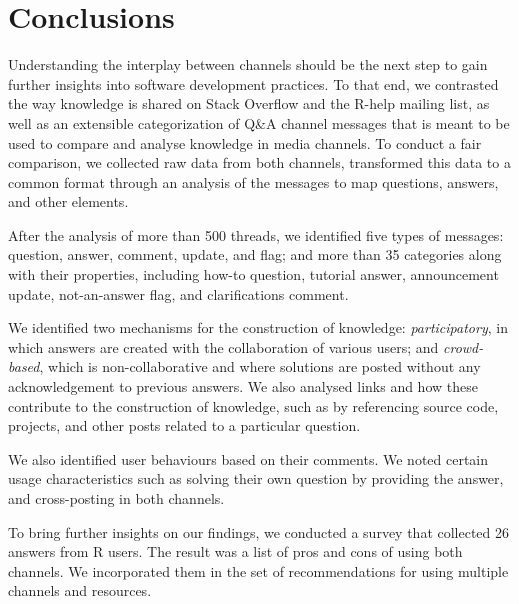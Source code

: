 \documentclass{sig-alternate-05-2015}
\begin{document}
\section{Conclusions}
\label{cha:conclusion}

	Understanding the interplay between channels should be the next step to gain further insights into software development practices.
	To that end, we contrasted the way knowledge is shared on Stack Overflow and the R-help mailing list, as well as an extensible categorization of Q\&A channel messages that is meant to be used to compare and analyse knowledge in media channels.
	To conduct a fair comparison, we collected raw data from both channels, transformed this data to a common format through an analysis of the messages to map questions, answers, and other elements.

	After the analysis of more than 500 threads, we identified five types of messages: question, answer, comment, update, and flag; and more than 35 categories along with their properties, including how-to question, tutorial answer, announcement update, not-an-answer flag, and clarifications comment.

	We identified two mechanisms for the construction of knowledge: \emph{participatory}, in which answers are created with the collaboration of various users; and \emph{crowd-based}, which is non-collaborative and where solutions are posted without any acknowledgement to previous answers.
	We also analysed links and how these contribute to the construction of knowledge, such as by referencing source code, projects, and other posts related to a particular question.

	We also identified user behaviours based on their comments.
	We noted certain usage characteristics such as solving their own question by providing the answer, and cross-posting in both channels.

	To bring further insights on our findings, we conducted a survey that collected 26 answers from R users.
	The result was a list of pros and cons of using both channels. We incorporated them in the set of recommendations for using multiple channels and resources.





\end{document}
